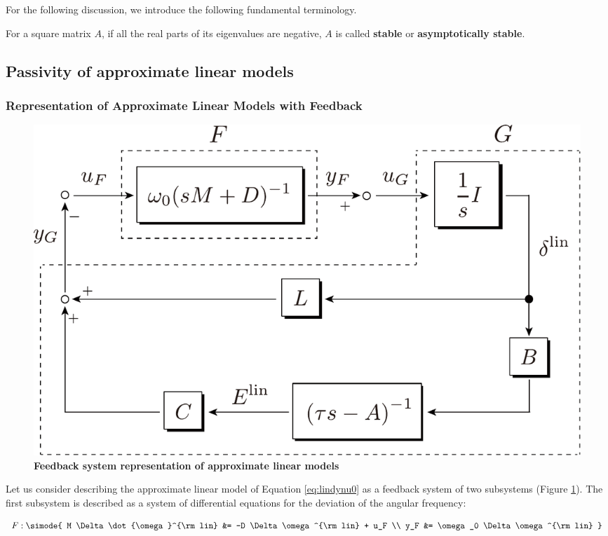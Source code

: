 \documentclass[graybox, envcountchap]{svmult}
\begin{document}
For the following discussion, we introduce the following fundamental
terminology.

\begin{definition}
\label{def:matsta}
For a square matrix $A$, if all the real parts of its eigenvalues are negative,
$A$ is called \textbf{stable} or \textbf{asymptotically
stable}.
\end{definition}

\subsection{Passivity of approximate linear models\advanced}\label{sec:linpasana}

\smallskip
\subsubsection{Representation of Approximate Linear Models with Feedback}

\begin{figure}[t]
\centering
\includegraphics[width = .7\linewidth]{figs/FandG}
\medskip
\caption{\textbf{Feedback system representation of approximate linear models}}
\label{fig:GandG}
\medskip
\end{figure}

Let us consider describing the approximate linear model of Equation
\ref{eq:lindynu0} as a feedback system of two subsystems (Figure
\ref{fig:GandG}).  The first subsystem is described as a system of differential
equations for the deviation of the angular frequency:

\begin{equation}\label{eq:Fss}
  F: \simode{
  M \Delta \dot{\omega}^{\rm lin} &= -D \Delta \omega^{\rm lin}
  +
  u_F \\
  y_F &= \omega_0 \Delta \omega^{\rm lin}
  }
\end{equation}
\end{document}
